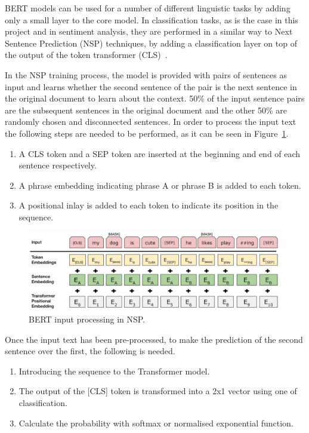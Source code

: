 BERT models can be used for a number of different linguistic tasks by adding only a small layer to the core model. In classification tasks, as is the case in this project and in sentiment analysis, they are performed in a similar way to Next Sentence Prediction (NSP) techniques, by adding a classification layer on top of the output of the token transformer (CLS)~\cite{BERTExpl89:online}.

In the NSP training process, the model is provided with pairs of sentences as input and learns whether the second sentence of the pair is the next sentence in the original document to learn about the context. 50\% of the input sentence pairs are the subsequent sentences in the original document and the other 50\% are randomly chosen and disconnected sentences. In order to process the input text the following steps are needed to be performed, as it can be seen in Figure~\ref{fig:BERTinput}.

\begin{enumerate}
    \item A CLS token and a SEP token are inserted at the beginning and end of each sentence respectively.
    \item A phrase embedding indicating phrase A or phrase B is added to each token.
    \item A positional inlay is added to each token to indicate its position in the sequence.
\end{enumerate}

\begin{figure}[!htp]
    \centering
    \includegraphics[scale=0.35]{img/detection/BERTinput.png}
    \caption{BERT input processing in NSP.}
    \label{fig:BERTinput}
\end{figure}
Once the input text has been pre-processed, to make the prediction of the second sentence over the first, the following is needed.

\begin{enumerate}
    \item Introducing the sequence to the Transformer model.
    \item The output of the [CLS] token is transformed into a 2x1 vector using one of classification.
    \item Calculate the probability with softmax or normalised exponential function.
\end{enumerate}

